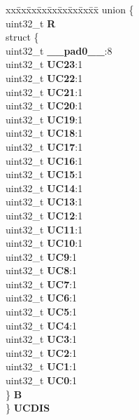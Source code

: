 \begin{DoxyCompactItemize}
\begin{tabbing}
\end{tabbing}\item 
\mbox{\label{structEMIOS__tag_adcbad6bf1faf1d18e053d579d8f408a4}} 
\begin{tabbing}
xx\=xx\=xx\=xx\=xx\=xx\=xx\=xx\=xx\=\kill
union \{\\
\>uint32\_t {\bfseries R}\\
\>struct \{\\
\>\>uint32\_t {\bfseries \_\_pad0\_\_}:8\\
\>\>uint32\_t {\bfseries UC23}:1\\
\>\>uint32\_t {\bfseries UC22}:1\\
\>\>uint32\_t {\bfseries UC21}:1\\
\>\>uint32\_t {\bfseries UC20}:1\\
\>\>uint32\_t {\bfseries UC19}:1\\
\>\>uint32\_t {\bfseries UC18}:1\\
\>\>uint32\_t {\bfseries UC17}:1\\
\>\>uint32\_t {\bfseries UC16}:1\\
\>\>uint32\_t {\bfseries UC15}:1\\
\>\>uint32\_t {\bfseries UC14}:1\\
\>\>uint32\_t {\bfseries UC13}:1\\
\>\>uint32\_t {\bfseries UC12}:1\\
\>\>uint32\_t {\bfseries UC11}:1\\
\>\>uint32\_t {\bfseries UC10}:1\\
\>\>uint32\_t {\bfseries UC9}:1\\
\>\>uint32\_t {\bfseries UC8}:1\\
\>\>uint32\_t {\bfseries UC7}:1\\
\>\>uint32\_t {\bfseries UC6}:1\\
\>\>uint32\_t {\bfseries UC5}:1\\
\>\>uint32\_t {\bfseries UC4}:1\\
\>\>uint32\_t {\bfseries UC3}:1\\
\>\>uint32\_t {\bfseries UC2}:1\\
\>\>uint32\_t {\bfseries UC1}:1\\
\>\>uint32\_t {\bfseries UC0}:1\\
\>\} {\bfseries B}\\
\} {\bfseries UCDIS}\\


\end{tabbing}
\end{DoxyCompactItemize}
